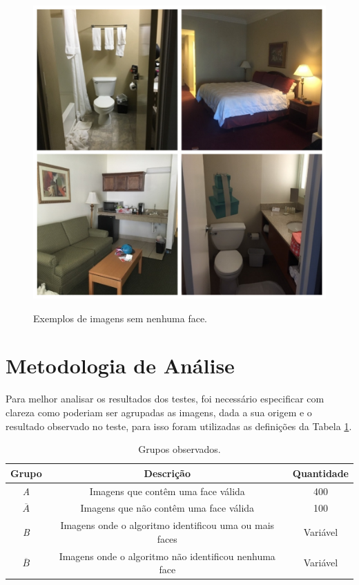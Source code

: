 \begin{figure}[htb]
    \centering
    \caption{Exemplos de imagens sem nenhuma face.}
    \includegraphics[scale=.25]{figs/hotels.jpg}
    \label{fig:hotel-examples}
\end{figure}

\section{Metodologia de Análise}

Para melhor analisar os resultados dos testes, foi necessário especificar com clareza como poderiam ser agrupadas as imagens, dada a sua origem e o resultado observado no teste, para isso foram utilizadas as definições da Tabela \ref{tab:grupos-images}.

\begin{table}[htbp]
    \caption{Grupos observados.}
    \label{tab:grupos-images}
    \centering
    \begin{tabular}{ccc}\hline\hline
        \textbf{Grupo} & \textbf{Descrição}                                     & \textbf{Quantidade} \\\hline
        \textit{A}     & Imagens que contêm uma face válida                     & 400                 \\
        $\overline{A}$ & Imagens que não contêm uma face válida                 & 100                 \\
        \textit{B}     & Imagens onde o algoritmo identificou uma ou mais faces & Variável            \\
        $\overline{B}$ & Imagens onde o algoritmo não identificou nenhuma face  & Variável            \\
        \hline\hline
    \end{tabular}
\end{table}

